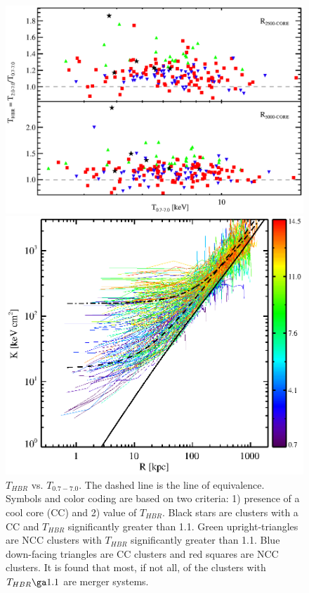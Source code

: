 \documentclass[letterpaper,12pt]{article}
\begin{document}
\begin{figure}[t]
    \begin{minipage}[t]{0.5\linewidth}
        \centering
        \includegraphics*[width=\textwidth, trim=17mm 3mm 10mm 11mm, clip]{thbr.eps}
        \caption{\footnotesize $T_{HBR}$ vs. $T_{0.7-7.0}$. The dashed
          line is the line of equivalence. Symbols and color coding
          are based on two criteria: 1) presence of a cool core (CC)
          and 2) value of $T_{HBR}$. Black stars are clusters with a
          CC and $T_{HBR}$ significantly greater than 1.1. Green
          upright-triangles are NCC clusters with $T_{HBR}$
          significantly greater than 1.1. Blue down-facing triangles
          are CC clusters and red squares are NCC clusters. It is
          found that most, if not all, of the clusters with $T_{HBR}
          \ga 1.1$ are merger systems.}
        \label{fig:thbr}
    \end{minipage}
    \hspace{0.1in}
    \begin{minipage}[t]{0.5\linewidth}
        \centering
        \includegraphics*[width=\textwidth, trim=28mm 7mm 30mm 17mm, clip]{splots_allt.eps}

\end{minipage}
\end{figure}
\end{document}
